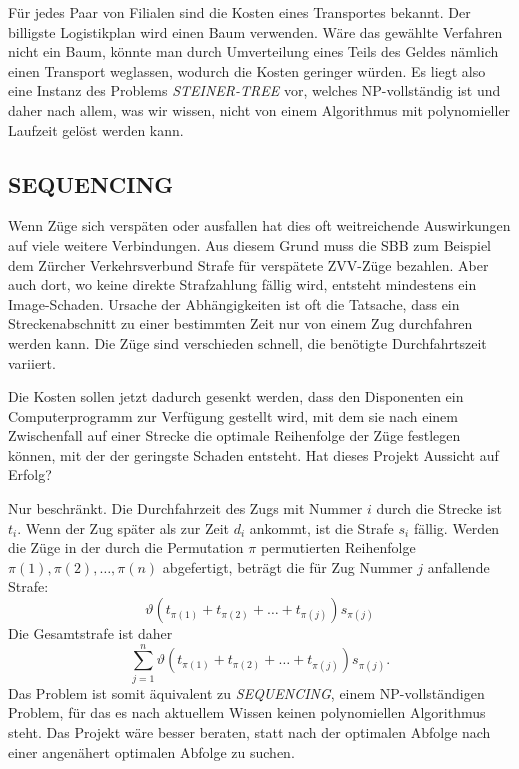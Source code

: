 \medskip

Für jedes Paar von Filialen sind die Kosten eines Transportes
bekannt.
Der billigste Logistikplan wird einen Baum verwenden.
Wäre das gewählte Verfahren nicht ein Baum, könnte man
durch Umverteilung eines Teils des Geldes nämlich einen
Transport weglassen, wodurch die Kosten geringer würden.
Es liegt also eine Instanz des Problems {\it STEINER-TREE}
vor, welches NP-vollständig ist und daher nach allem, was
wir wissen, nicht von einem Algorithmus mit polynomieller
Laufzeit gelöst werden kann.

\subsection{SEQUENCING}
Wenn Züge sich verspäten oder ausfallen hat dies oft weitreichende
Auswirkungen auf viele weitere Verbindungen.
Aus diesem Grund muss die SBB zum Beispiel dem Zürcher Verkehrsverbund
Strafe für verspätete ZVV-Züge bezahlen.
Aber auch dort, wo
keine direkte Strafzahlung fällig wird, entsteht mindestens ein
Image-Schaden.
Ursache der Abhängigkeiten ist oft die Tatsache,
dass ein Streckenabschnitt zu einer bestimmten Zeit nur von einem
Zug durchfahren werden kann.
Die Züge sind verschieden schnell,
die benötigte Durchfahrtszeit variiert.

Die Kosten sollen jetzt dadurch gesenkt werden, dass den Disponenten
ein Computerprogramm zur Verfügung gestellt wird, mit dem sie nach
einem Zwischenfall auf einer Strecke die optimale Reihenfolge der Züge
festlegen können, mit der der geringste Schaden entsteht.
Hat dieses Projekt Aussicht auf Erfolg?

\medskip

Nur beschränkt.
Die Durchfahrzeit des Zugs mit Nummer $i$ durch die Strecke ist $t_i$.
Wenn der Zug später als zur Zeit $d_i$ ankommt, ist die Strafe $s_i$
fällig.
Werden die Züge in der durch die Permutation $\pi$
permutierten Reihenfolge  $\pi(1),\pi(2),\dots,\pi(n)$ abgefertigt,
beträgt die für Zug Nummer $j$ anfallende Strafe:
\[
\vartheta(t_{\pi(1)}+t_{\pi(2)}+\dots+t_{\pi(j)})s_{\pi(j)}
\]
Die Gesamtstrafe ist daher
\[
\sum_{j=1}^n \vartheta(t_{\pi(1)}+t_{\pi(2)}+\dots+t_{\pi(j)})s_{\pi(j)}.
\]
Das Problem ist somit äquivalent zu {\it SEQUENCING}, einem
NP-vollständigen Problem, für das es nach aktuellem Wissen keinen
polynomiellen Algorithmus steht.
Das Projekt wäre besser beraten,
statt nach der optimalen Abfolge nach einer angenähert optimalen Abfolge
zu suchen.

